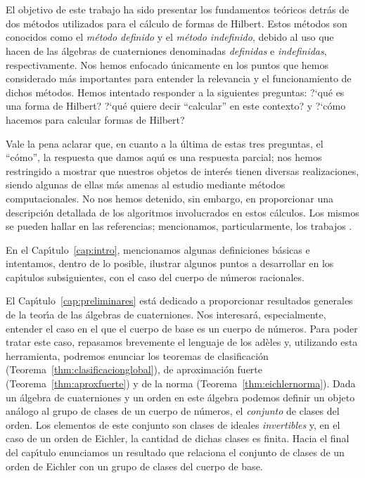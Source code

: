 \section*{\null}
El objetivo de este trabajo ha sido presentar los fundamentos te\'{o}ricos
detr\'{a}s de dos m\'{e}todos utilizados para el c\'{a}lculo de formas de
Hilbert. Estos m\'{e}todos son conocidos como el \emph{m\'{e}todo definido} y
el \emph{m\'{e}todo indefinido}, debido al uso que hacen de las \'{a}lgebras de
cuaterniones denominadas \emph{definidas} e \emph{indefinidas},
respectivamente. Nos hemos enfocado \'{u}nicamente en los puntos que hemos
considerado m\'{a}s importantes para entender la relevancia y el funcionamiento
de dichos m\'{e}todos. Hemos intentado responder a la siguientes preguntas:
?`qu\'{e} es una forma de Hilbert? ?`qu\'{e} quiere decir ``calcular'' en este
contexto? y ?`c\'{o}mo hacemos para calcular formas de Hilbert?

Vale la pena aclarar que, en cuanto a la \'{u}ltima de estas tres preguntas, el
``c\'{o}mo'', la respuesta que damos aqu\'{\i} es una respuesta parcial; nos
hemos restringido a mostrar que nuestros objetos de inter\'{e}s tienen diversas
realizaciones, siendo algunas de ellas m\'{a}s amenas al estudio mediante
m\'{e}todos computacionales. No nos hemos detenido, sin embargo, en
proporcionar una descripci\'{o}n detallada de los algoritmos involucrados en
estos c\'{a}lculos. Los mismos se pueden hallar en las referencias;
mencionamos, particularmente, los trabajos \cite{DembeleExplicitOnQQsqrt5,
DembeleManinSymbols,DembeleDonnellyNontrivial,DembeleVoight,
GreenbergVoight,VoightComputingOverArbitrary}.

En el Cap\'{\i}tulo~\ref{cap:intro}, mencionamos algunas definiciones
b\'{a}sicas e intentamos, dentro de lo posible, ilustrar algunos puntos a
desarrollar en los cap\'{\i}tulos subsiguientes, con el caso del cuerpo de
n\'{u}meros racionales.

El Cap\'{\i}tulo~\ref{cap:preliminares} est\'{a} dedicado a proporcionar
resultados generales de la teor\'{\i}a de las \'{a}lgebras de cuaterniones. Nos
interesar\'{a}, especialmente, entender el caso en el que el cuerpo de base es
un cuerpo de n\'{u}meros. Para poder tratar este caso, repasamos brevemente el
lenguaje de los ad\`{e}les y, utilizando esta herramienta, podremos enunciar
los teoremas de clasificaci\'{o}n (Teorema~\ref{thm:clasificacionglobal}), de
aproximaci\'{o}n fuerte (Teorema~\ref{thm:aproxfuerte}) y de la norma
(Teorema~\ref{thm:eichlernorma}). Dada un \'{a}lgebra de cuaterniones y un
orden en este \'{a}lgebra podemos definir un objeto an\'{a}logo al grupo de
clases de un cuerpo de n\'{u}meros, el \emph{conjunto} de clases del orden. Los
elementos de este conjunto son clases de ideales \emph{invertibles} y, en el
caso de un orden de Eichler, la cantidad de dichas clases es finita. Hacia el
final del cap\'{\i}tulo enunciamos un resultado que relaciona el conjunto de
clases de un orden de Eichler con un grupo de clases del cuerpo de base.

